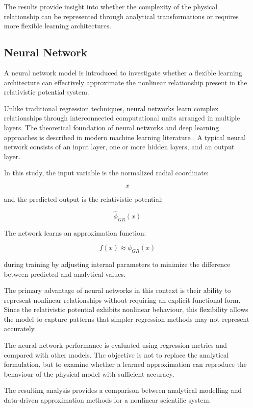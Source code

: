 \documentclass[
]{article}
\begin{document}
The results provide insight into whether the complexity of the physical
relationship can be represented through analytical transformations or
requires more flexible learning architectures.

\subsection{Neural Network}\label{neural-network}

A neural network model is introduced to investigate whether a flexible
learning architecture can effectively approximate the nonlinear
relationship present in the relativistic potential system.

Unlike traditional regression techniques, neural networks learn complex
relationships through interconnected computational units arranged in
multiple layers. The theoretical foundation of neural networks and deep
learning approaches is described in modern machine learning literature
\cite{goodfellow2016}. A typical neural network consists of an input
layer, one or more hidden layers, and an output layer.

In this study, the input variable is the normalized radial coordinate:

\[
x
\]

and the predicted output is the relativistic potential:

\[
\hat{\phi}_{GR}(x)
\]

The network learns an approximation function:

\[
f(x)\approx \phi_{GR}(x)
\]

during training by adjusting internal parameters to minimize the
difference between predicted and analytical values.

The primary advantage of neural networks in this context is their
ability to represent nonlinear relationships without requiring an
explicit functional form. Since the relativistic potential exhibits
nonlinear behaviour, this flexibility allows the model to capture
patterns that simpler regression methods may not represent accurately.

The neural network performance is evaluated using regression metrics and
compared with other models. The objective is not to replace the
analytical formulation, but to examine whether a learned approximation
can reproduce the behaviour of the physical model with sufficient
accuracy.

The resulting analysis provides a comparison between analytical
modelling and data-driven approximation methods for a nonlinear
scientific system.
\end{document}
